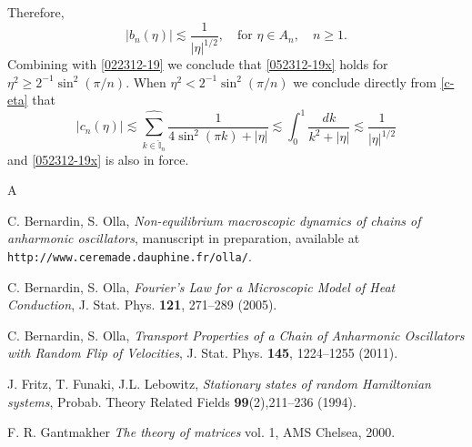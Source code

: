 \documentclass[EJP]{ejpecp} %
\newcommand\T{{\mathbb I}}
\renewcommand{\ge}{\geqslant}
\renewcommand{\hat}{\widehat}
\numberwithin{equation}{section}
\begin{document}
Therefore, 
$$
|b_n(\eta)|\lesssim 
\frac{1}{|\eta|^{1/2}},\quad \mbox{for }\eta\in A_n,\quad n\ge1.
$$
Combining with \eqref{022312-19} we conclude that 
\eqref{052312-19x} holds for
$\eta^2\ge 2^{-1}\sin^2(\pi/n)$.
When $\eta^2< 2^{-1}\sin^2(\pi/n)$ we conclude directly from \eqref{c-eta} that
$$
|c_n(\eta)|\lesssim \underset{{k\in \widehat{\T}_n}}{{\hat\sum}}\frac{1}{4\sin^2(\pi k)+|\eta|
}\lesssim \int_0^1\frac{dk}{k^2+|\eta|}\lesssim \frac{1}{|\eta|^{1/2}}
$$
and \eqref{052312-19x} is also in force.



\bigskip





\begin{thebibliography}{A}

%
%
 C. Bernardin, S. Olla, \emph{Non-equilibrium macroscopic
  dynamics of chains of anharmonic oscillators}, manuscript in
  preparation, available at \texttt{http://www.ceremade.dauphine.fr/olla/}.  

 C. Bernardin, S. Olla, \emph{Fourier's Law for a Microscopic Model of Heat Conduction}, 
J. Stat. Phys. \textbf{121}, 271--289 (2005).   


 C. Bernardin, S. Olla, \emph{Transport
Properties of a Chain of Anharmonic Oscillators with Random Flip of
Velocities}, J. Stat. Phys. \textbf{145}, 1224--1255 (2011).   


 J. Fritz, T.  Funaki, J.L. Lebowitz,  \emph{ Stationary
  states of random Hamiltonian systems}, Probab. Theory Related
      Fields \textbf{99}(2),211--236 (1994).  

%

 F. R.  Gantmakher {\em The theory of matrices} vol. 1, AMS Chelsea, 2000.


\end{thebibliography}
\end{document}
